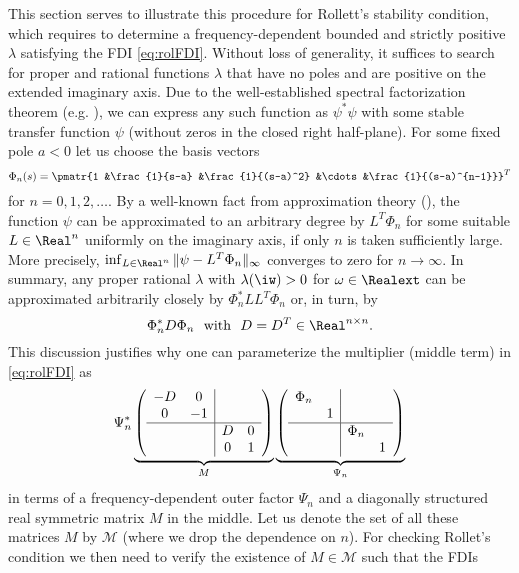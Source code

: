 This section serves to illustrate this procedure for Rollett's stability condition, which requires to determine a frequency-dependent bounded and strictly positive $\lambda$ satisfying the FDI \eqref{eq:rolFDI}. Without loss of generality, it suffices to search for proper and rational functions $\lambda$ that have no poles and are positive on the extended imaginary axis.
Due to the well-established spectral factorization theorem (e.g. \cite{francis}), we can express any such function as $\psi^*\psi$ with some stable transfer function $\psi$ (without zeros in the closed right half-plane). For some fixed pole $a<0$ let us choose the basis vectors 
\begin{equation*}
\Phi_n(s) = \pmatr{1 &\frac{1}{s-a} &\frac{1}{(s-a)^2} &\cdots &\frac{1}{(s-a)^{n-1}}}^T
\end{equation*}
for $n=0,1,2,\ldots$. By a well-known fact from approximation theory (\cite{pinkus}), the function $\psi$ can be approximated to an arbitrary degree by $L^T\Phi_n$ for some suitable $L\in\Real^n$ uniformly on the imaginary axis, if only $n$ is taken sufficiently large. More precisely, $\inf_{L\in\Real^n}\|\psi-L^T\Phi_n\|_\infty$ converges to zero for $n\to\infty$.
In summary, any proper rational $\lambda$ with $\lambda(\iw)>0$ for $\omega\in\Realext$ can be approximated arbitrarily closely by $\Phi_n^*LL^T\Phi_n$ or, in turn, by
$$
\Phi_n^*D\Phi_n\text{\ \ with\ \ }D=D^T\in\Real^{n\times n}.
$$
This discussion justifies why one can parameterize the multiplier (middle term) in \eqref{eq:rolFDI} as
\begin{equation*}
\Psi_n^*
\underbrace{\left(\begin{array}{cc|cc}
-D&0  & 				& \\
0	  			&-1  &  				&\\ \hline
	  			& 	&D &0\\
	  			& 	&0 				&1
\end{array}\right)}_{M}
\underbrace{\left(\begin{array}{cc|cc}\Phi_n &&&\\ &1 &&\\\hline &&\Phi_n& \\&&&1\end{array}\right)}_{\Psi_n}
\end{equation*}
in terms of a frequency-dependent outer factor $\Psi_n$ and a diagonally structured real symmetric matrix $M$ in the middle. Let us denote the set of all these matrices $M$ by $\mathcal{M}$
(where we drop the dependence on $n$). For checking Rollet's condition we then need to verify the existence of $M\in{\mathcal{M}}$ such that the FDIs
